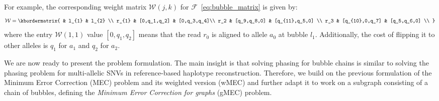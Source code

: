 For example, the corresponding weight matrix $\mathcal{W}(j,k)$ for $\mathcal{F}$~\eqref{eq:bubble_matrix} is given by:
\begin{equation}\label{eq:weight_matrix}
  \mathcal{W}  = \kbordermatrix{
     & l_{1}       & l_{2}  \\
    r_{1}       & [0,q_1,q_2] &  [0,q_3,q_4]\\
    r_2 & [q_9,q_8,0] & [q_{11},q_5,0] \\
    r_3 & [q_{10},0,q_7] & [q_5,q_6,0] \\
  }
\end{equation}
where the entry $\mathcal{W}(1,1)$ value $[0,q_1,q_2]$ means that the read $r_0$ is aligned to allele $a_0$ at bubble $l_1$.
Additionally, the cost of flipping it to other alleles is $q_1$ for $a_1$ and $q_2$ for $a_2$.

We are now ready to present the problem formulation.
The main insight is that solving phasing for bubble chains is similar to solving the phasing problem for multi-allelic SNVs in reference-based haplotype reconstruction.
Therefore, we build on the previous formulation of the Minimum Error Correction (MEC) problem \citep{Lancia2001} and its weighted version (wMEC) \citep{lippert2002algorithmic,Patterson2015} and further adapt it to work on a subgraph consisting of a chain of bubbles, defining the \emph{Minimum Error Correction for graphs} (gMEC) problem.

% 

